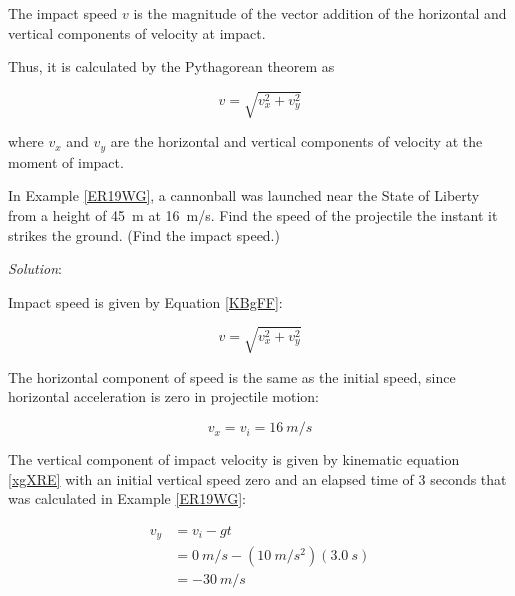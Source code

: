 \documentclass[dvipsnames]{article}
\begin{document}
The impact speed $v$ is the magnitude of the vector addition of the horizontal and vertical components of velocity at impact.


\begin{center}
\end{center}

Thus, it is calculated by the Pythagorean theorem as

\begin{equation} \label{KBgFF}
    v = \sqrt{v_x^2 + v_y^2}
\end{equation}

where $v_x$ and $v_y$ are the horizontal and vertical components of velocity at the moment of impact.

\begin{example}
    In Example \ref{ER19WG}, a cannonball was launched near the State of Liberty from a height of \SI{45}{m} at \SI{16}{m/s}. Find the speed of the projectile the instant it strikes the ground. (Find the impact speed.)
\end{example}

\textit{Solution}:

Impact speed is given by Equation \eqref{KBgFF}:

\begin{equation*}
    v = \sqrt{v_x^2 + v_y^2}
\end{equation*}

The horizontal component of speed is the same as the initial speed, since horizontal acceleration is zero in projectile motion:

\begin{equation*}
    v_x = v_i = \SI{16}{m/s}
\end{equation*}

The vertical component of impact velocity is given by kinematic equation \eqref{xgXRE} with an initial vertical speed zero and an elapsed time of 3 seconds that was calculated in Example \ref{ER19WG}:

\begin{align*}
    v_y &= v_i - gt \\[1ex]
    &= \SI{0}{m/s} - (\SI{10}{m/s^2})(\SI{3.0}{s}) \\[1ex]
    &= -\SI{30}{m/s}
\end{align*}
\end{document}
